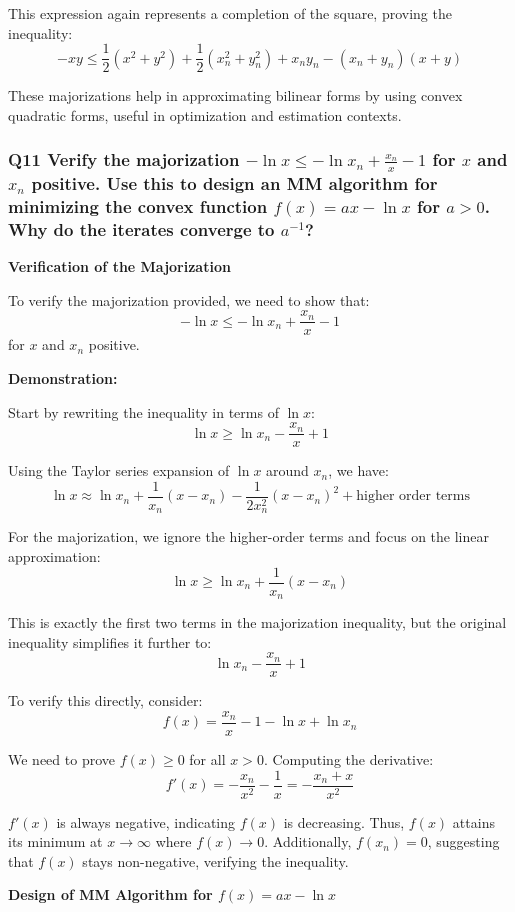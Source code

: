 \documentclass[8pt]{article}
\begin{document}
{This expression again represents a completion of the square, proving the inequality:
\[
-xy \leq \frac{1}{2} (x^2 + y^2) + \frac{1}{2} (x_n^2 + y_n^2) + x_ny_n - (x_n + y_n)(x + y)
\]

These majorizations help in approximating bilinear forms by using convex quadratic forms, useful in optimization and estimation contexts.

\subsubsection*{Q11 Verify the majorization \(- \ln x \leq - \ln x_n + \frac{x_n}{x} - 1\) for \(x\) and \(x_n\) positive. Use this to design an MM algorithm for minimizing the convex function \(f(x) = ax - \ln x\) for \(a > 0\). Why do the iterates converge to \(a^{-1}\)?}

\textbf{Verification of the Majorization}

To verify the majorization provided, we need to show that:
\[
- \ln x \leq - \ln x_n + \frac{x_n}{x} - 1
\]
for \(x\) and \(x_n\) positive.

\textbf{Demonstration:}

Start by rewriting the inequality in terms of \( \ln x \):
\[
\ln x \geq \ln x_n - \frac{x_n}{x} + 1
\]

Using the Taylor series expansion of \( \ln x \) around \( x_n \), we have:
\[
\ln x \approx \ln x_n + \frac{1}{x_n}(x - x_n) - \frac{1}{2x_n^2}(x - x_n)^2 + \text{higher order terms}
\]

For the majorization, we ignore the higher-order terms and focus on the linear approximation:
\[
\ln x \geq \ln x_n + \frac{1}{x_n}(x - x_n)
\]

This is exactly the first two terms in the majorization inequality, but the original inequality simplifies it further to:
\[
\ln x_n - \frac{x_n}{x} + 1
\]

To verify this directly, consider:
\[
f(x) = \frac{x_n}{x} - 1 - \ln x + \ln x_n
\]

We need to prove \( f(x) \geq 0 \) for all \( x > 0 \). Computing the derivative:
\[
f'(x) = -\frac{x_n}{x^2} - \frac{1}{x} = -\frac{x_n + x}{x^2}
\]

\( f'(x) \) is always negative, indicating \( f(x) \) is decreasing. Thus, \( f(x) \) attains its minimum at \( x \to \infty \) where \( f(x) \to 0 \). Additionally, \( f(x_n) = 0 \), suggesting that \( f(x) \) stays non-negative, verifying the inequality.

\textbf{Design of MM Algorithm for \( f(x) = ax - \ln x \)}

}
\end{document}
